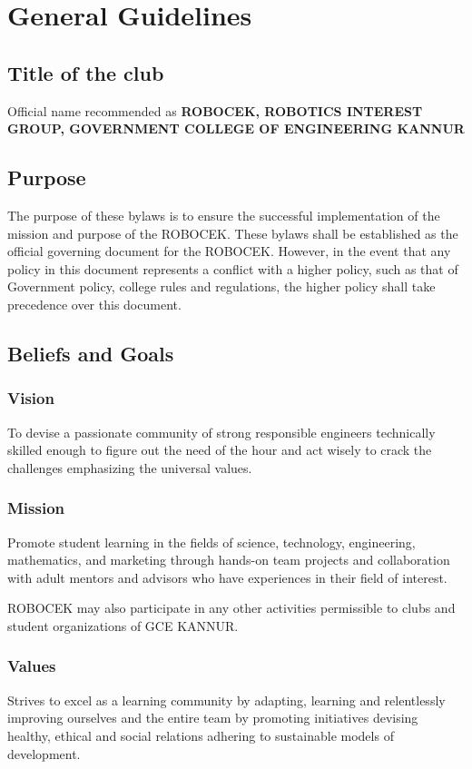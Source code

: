 \chapter{General Guidelines}

\section{Title of the club}
Official name recommended as \textbf{ROBOCEK, ROBOTICS INTEREST GROUP, GOVERNMENT COLLEGE OF ENGINEERING KANNUR}

\section{Purpose}
The purpose of these bylaws is to ensure the successful implementation of the mission and purpose of the ROBOCEK. These bylaws shall be established as the official governing document for the ROBOCEK. However, in the event that any policy in this document represents a conflict with a higher policy, such as that of Government policy, college rules and regulations, the higher policy shall take precedence over this document.

\section{Beliefs and Goals}
\subsection{Vision}
To devise a passionate community of strong responsible engineers technically skilled enough to figure out the need of the hour and act wisely to crack the challenges emphasizing the universal values.

\subsection{Mission}
Promote student learning in the fields of science, technology, engineering, mathematics, and marketing through hands-on  team projects and collaboration with adult mentors and advisors who have experiences in their field of interest.
\par ROBOCEK may also participate in any other activities permissible to clubs and student organizations of GCE KANNUR.

\subsection{Values}
Strives to excel as a learning community by adapting, learning and relentlessly improving ourselves and the entire team by promoting initiatives devising healthy, ethical and social relations adhering to sustainable models of development.

